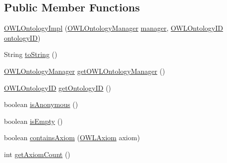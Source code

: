 \subsection*{Public Member Functions}
\begin{DoxyCompactItemize}
\item 
\hyperlink{classuk_1_1ac_1_1manchester_1_1cs_1_1owl_1_1owlapi_1_1_o_w_l_ontology_impl_a5c119242326a4d1fcc01c25a0d7b7f50}{O\-W\-L\-Ontology\-Impl} (\hyperlink{interfaceorg_1_1semanticweb_1_1owlapi_1_1model_1_1_o_w_l_ontology_manager}{O\-W\-L\-Ontology\-Manager} \hyperlink{classuk_1_1ac_1_1manchester_1_1cs_1_1owl_1_1owlapi_1_1_o_w_l_ontology_impl_a5d4d9b357f427678556b0364c20fbe12}{manager}, \hyperlink{classorg_1_1semanticweb_1_1owlapi_1_1model_1_1_o_w_l_ontology_i_d}{O\-W\-L\-Ontology\-I\-D} \hyperlink{classuk_1_1ac_1_1manchester_1_1cs_1_1owl_1_1owlapi_1_1_o_w_l_ontology_impl_aace8dbfe714fb87d1816cb792cbd1695}{ontology\-I\-D})
\item 
String \hyperlink{classuk_1_1ac_1_1manchester_1_1cs_1_1owl_1_1owlapi_1_1_o_w_l_ontology_impl_a13280df7a9875c23b8e050725d3a004b}{to\-String} ()
\item 
\hyperlink{interfaceorg_1_1semanticweb_1_1owlapi_1_1model_1_1_o_w_l_ontology_manager}{O\-W\-L\-Ontology\-Manager} \hyperlink{classuk_1_1ac_1_1manchester_1_1cs_1_1owl_1_1owlapi_1_1_o_w_l_ontology_impl_a43cf535169373f92dd8027accf5cb23a}{get\-O\-W\-L\-Ontology\-Manager} ()
\item 
\hyperlink{classorg_1_1semanticweb_1_1owlapi_1_1model_1_1_o_w_l_ontology_i_d}{O\-W\-L\-Ontology\-I\-D} \hyperlink{classuk_1_1ac_1_1manchester_1_1cs_1_1owl_1_1owlapi_1_1_o_w_l_ontology_impl_ada6cb5a2502345dc3b8199088ea0aa04}{get\-Ontology\-I\-D} ()
\item 
boolean \hyperlink{classuk_1_1ac_1_1manchester_1_1cs_1_1owl_1_1owlapi_1_1_o_w_l_ontology_impl_a0faae64e9216d64b77503aa38a9460c3}{is\-Anonymous} ()
\item 
boolean \hyperlink{classuk_1_1ac_1_1manchester_1_1cs_1_1owl_1_1owlapi_1_1_o_w_l_ontology_impl_a7016e951aee89c95705e175b6ea1fa9c}{is\-Empty} ()
\item 
boolean \hyperlink{classuk_1_1ac_1_1manchester_1_1cs_1_1owl_1_1owlapi_1_1_o_w_l_ontology_impl_a8053dfbf596cae1a166589c1e60687dd}{contains\-Axiom} (\hyperlink{interfaceorg_1_1semanticweb_1_1owlapi_1_1model_1_1_o_w_l_axiom}{O\-W\-L\-Axiom} axiom)
\item 
int \hyperlink{classuk_1_1ac_1_1manchester_1_1cs_1_1owl_1_1owlapi_1_1_o_w_l_ontology_impl_aa9f071b56cce576292036535805231f2}{get\-Axiom\-Count} ()

\end{DoxyCompactItemize}

